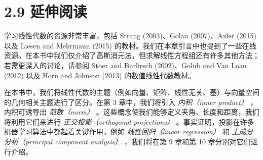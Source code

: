 \section*{2.9 延伸阅读}
\label{sec:2.9}

学习线性代数的资源非常丰富，包括 Strang (2003)、Golan (2007)、Axler (2015) 以及 Liesen and Mehrmann (2015) 的教材。我们在本章引言中也提到了一些在线资源。在本书中我们仅介绍了高斯消元法，但求解线性方程组还有许多其他方法；若需更深入的讨论，请参阅 Stoer and Burlirsch (2002)、Golub and Van Loan (2012) 以及 Horn and Johnson (2013) 的数值线性代数教材。

在本书中，我们将线性代数的主题（例如向量、矩阵、线性无关、基）与向量空间的几何相关主题进行了区分。在第 3 章中，我们将引入 \emph{内积（inner product）} ，内积可诱导出 \emph{范数（norm）} 。这些概念使我们能够定义夹角、长度和距离，我们将利用它们来进行 \emph{正交投影（orthogonal projections）} 。事实证明，投影在许多机器学习算法中都起着关键作用，例如 \emph{线性回归（linear regression）} 和 \emph{主成分分析（principal component analysis）} ，我们将在第 9 章和第 10 章分别对它们进行介绍。
